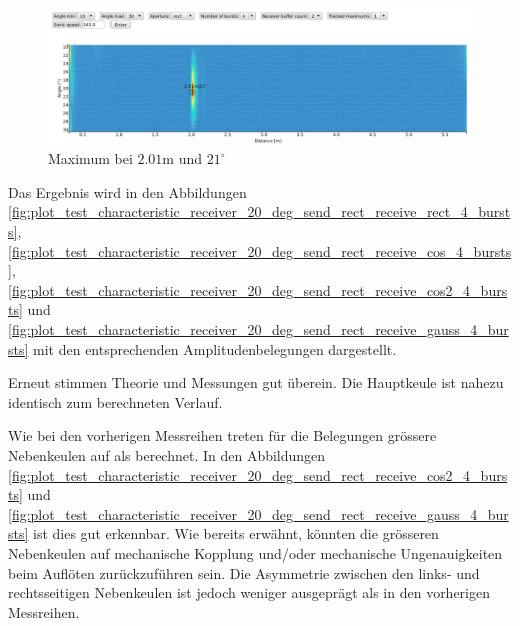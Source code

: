 \begin{figure}[htb]
\includegraphics[width=\textwidth]{graphics/image_test_characteristic_receiver_20_deg_send.png}
\caption{Maximum bei $2.01 \mathrm{m}$ und $21^{\circ}$} %
\label{fig:image_test_characteristic_receiver_20_deg_send}
\end{figure}
%

Das Ergebnis wird in den Abbildungen \ref{fig:plot_test_characteristic_receiver_20_deg_send_rect_receive_rect_4_bursts}, \ref{fig:plot_test_characteristic_receiver_20_deg_send_rect_receive_cos_4_bursts}, \ref{fig:plot_test_characteristic_receiver_20_deg_send_rect_receive_cos2_4_bursts} und \ref{fig:plot_test_characteristic_receiver_20_deg_send_rect_receive_gauss_4_bursts} mit den entsprechenden Amplitudenbelegungen dargestellt.

Erneut stimmen Theorie und Messungen gut überein. Die Hauptkeule ist nahezu identisch zum berechneten Verlauf.

Wie bei den vorherigen Messreihen treten für die Belegungen grössere Nebenkeulen auf als berechnet. In den Abbildungen \ref{fig:plot_test_characteristic_receiver_20_deg_send_rect_receive_cos2_4_bursts} und \ref{fig:plot_test_characteristic_receiver_20_deg_send_rect_receive_gauss_4_bursts} ist dies gut erkennbar. Wie bereits erwähnt, könnten die grösseren Nebenkeulen auf mechanische Kopplung und/oder mechanische Ungenauigkeiten beim Auflöten zurückzuführen sein. Die Asymmetrie zwischen den links- und rechtsseitigen Nebenkeulen ist jedoch weniger ausgeprägt als in den vorherigen Messreihen.

